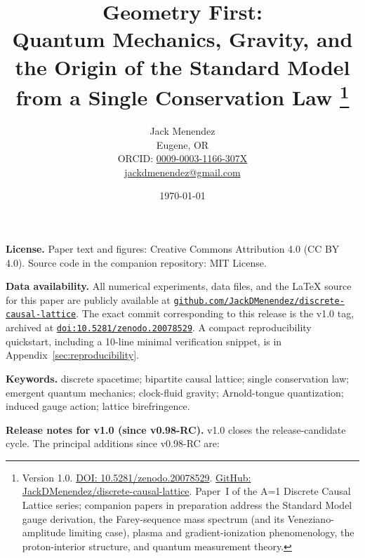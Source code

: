 \documentclass[12pt, letterpaper]{article}
\title{Geometry First:\\
       Quantum Mechanics, Gravity, and the Origin of the Standard Model\\
       from a Single Conservation Law%
       \thanks{Version 1.0.
       \href{https://doi.org/10.5281/zenodo.20078529}%
            {DOI: 10.5281/zenodo.20078529}.
       \href{https://github.com/JackDMenendez/discrete-causal-lattice}%
            {GitHub: JackDMenendez/discrete-causal-lattice}.
       Paper~I of the A=1 Discrete Causal Lattice series; companion
       papers in preparation address the Standard Model gauge
       derivation, the Farey-sequence mass spectrum (and its
       Veneziano-amplitude limiting case), plasma and
       gradient-ionization phenomenology, the proton-interior
       structure, and quantum measurement theory.}}
\author{Jack Menendez\\
        \small Eugene, OR\\
        \small ORCID: \href{https://orcid.org/0009-0003-1166-307X}{0009-0003-1166-307X}\\
        \small \href{mailto:jackdmenendez@gmail.com}{jackdmenendez@gmail.com}}
\date{\today}
\begin{document}
\maketitle

\noindent\textbf{License.}  Paper text and figures: Creative Commons
Attribution 4.0 (CC BY 4.0).  Source code in the companion
repository: MIT License.

\medskip
\noindent\textbf{Data availability.}  All numerical experiments,
data files, and the LaTeX source for this paper are publicly
available at
\href{https://github.com/JackDMenendez/discrete-causal-lattice}%
     {\nolinkurl{github.com/JackDMenendez/discrete-causal-lattice}}.
The exact commit corresponding to this release is the v1.0 tag,
archived at
\href{https://doi.org/10.5281/zenodo.20078529}%
     {\nolinkurl{doi:10.5281/zenodo.20078529}}.
A compact reproducibility quickstart, including a 10-line minimal
verification snippet, is in
Appendix~\ref{sec:reproducibility}.

\medskip
\noindent\textbf{Keywords.}  discrete spacetime; bipartite causal
lattice; single conservation law; emergent quantum mechanics;
clock-fluid gravity; Arnold-tongue quantization; induced gauge
action; lattice birefringence.

\newpage

\begin{abstract}
    
\end{abstract}

\bigskip
\noindent\textbf{Release notes for v1.0 (since v0.98-RC).}
v1.0 closes the release-candidate cycle.  The principal additions
since v0.98-RC are:
\end{document}
